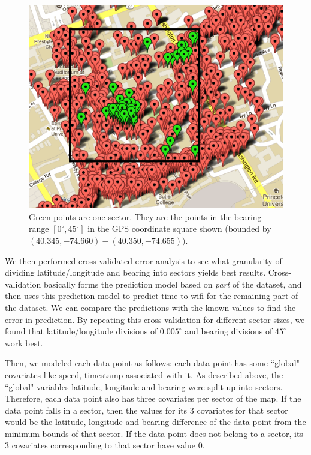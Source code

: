 \documentclass[12pt, fleqn]{article}
\begin{document}
\medskip
\begin{figure}[htp]
\centering
\includegraphics[scale=0.5]{img/map3033-sector.png}
\caption{Green points are one sector. They are the points in the bearing range $[0^\circ, 45^\circ]$ in the GPS coordinate square shown  (bounded by $(40.345, -74.660) - (40.350, -74.655))$. \label{fig-map-sector}}
\end{figure}
\medskip

We then performed cross-validated error analysis to see what granularity of 
dividing latitude/longitude and bearing into sectors yields best results. Cross-validation 
basically forms the prediction model based on \emph{part} of the dataset, and then 
uses this prediction model to predict time-to-wifi for the remaining part of the dataset. We can 
compare the predictions with the known values to find the error in prediction. 
By repeating this cross-validation for different sector sizes, we found that 
latitude/longitude divisions of $0.005^\circ$ and bearing divisions of $45^\circ$ work best.
 
Then, we modeled each data point as follows: each data point has some ``global" 
covariates like speed, timestamp associated with it. As described above, the ``global" variables
latitude, longitude and bearing were split up into sectors. Therefore, each data point also has 
three covariates per sector of the map. If the data point falls in a sector, 
then the values for its 3 covariates for that sector would be the latitude, 
longitude and bearing difference of the data point from the minimum bounds of 
that sector. If the data point does not belong to a sector, its 3 covariates 
corresponding to that sector have value 0. 
\end{document}
